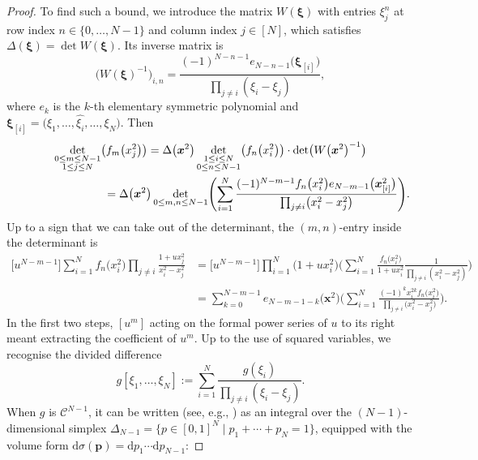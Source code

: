 \documentclass[pdftex]{sigma}
\numberwithin{equation}{section}
\newcommand{\dd}{\mathrm{d}}
\begin{document}
\begin{proof}
To find such a bound, we introduce the matrix $W(\boldsymbol{\xi})$ with entries $\xi_j^{n}$ at row index $n \in \{0,\dots,N - 1\}$ and column index $j \in [N]$, which satisfies $\Delta(\boldsymbol{\xi}) = \det W(\boldsymbol{\xi})$. Its inverse matrix is
\[
\bigl(W(\boldsymbol{\xi})^{-1}\bigr)_{i,n} = \frac{(-1)^{N - n - 1}e_{N - n - 1}\bigl(\boldsymbol{\xi}_{[i]}\bigr)}{\prod_{j \neq i} (\xi_i - \xi_j)},
\]
where $e_k$ is the $k$-th elementary symmetric polynomial and $\boldsymbol{\xi}_{[i]} = \bigl(\xi_1,\dots,\widehat{\xi_i},\dots,\xi_N\bigr)$. Then
\begin{gather}
\nonumber \mathop{\det}_{\substack{0 \leq m \leq N - 1 \\ 1 \leq j \leq N }} \bigl(f_m\bigl(x_j^2\bigr)\bigr) = \Delta\bigl(\boldsymbol{x}^2\bigr) \det_{\substack{1 \leq i \leq N \\ 0 \leq n \leq N - 1}} \bigl(f_n\bigl(x_i^2\bigr)\bigr) \cdot \det \bigl(W\bigl(\boldsymbol{x}^2\bigr)^{-1}\bigr) \\
\hphantom{\mathop{\det}_{\substack{0 \leq m \leq N - 1 \\ 1 \leq j \leq N }} \bigl(f_m\bigl(x_j^2\bigr)\bigr)}{} = \Delta\bigl(\boldsymbol{x}^2\bigr) \det_{0 \leq m,n \leq N - 1} \Biggl(\sum_{i = 1}^{N} \frac{(-1)^{N - m - 1} f_n\bigl(x_i^2\bigr) e_{N - m - 1}\bigl(\boldsymbol{x}^2_{[i]}\bigr)}{\prod_{j \neq i} \bigl(x_i^2 - x_j^2\bigr)}\Biggr).\label{26}
\end{gather}
Up to a sign that we can take out of the determinant, the $(m,n)$-entry inside the determinant is
\begin{align*}
 \bigl[u^{N - m - 1}\bigr] \sum_{i = 1}^N f_n\bigl(x_i^2\bigr) \prod_{j \neq i} \frac{1 + ux_j^2}{x_i^2 - x_j^2} & = \bigl[u^{N - m - 1}\bigr] \prod_{i = 1}^N \bigl(1 + ux_i^2\bigr)\!\Biggl( \sum_{i = 1}^N \frac{f_n\bigl(x_i^2\bigr)}{1 + ux_i^2} \frac{1}{\prod_{j \neq i} (x_i^2 - x_j^2)}\Biggr) \\
& = \sum_{k = 0}^{N - m - 1} e_{N - m - 1 - k}\bigl(\boldsymbol{x}^2\bigr)\!\Biggl( \sum_{i = 1}^{N} \frac{(-1)^k x_i^{2k} f_{n}\bigl(x_i^2\bigr)}{\prod_{j \neq i} \bigl(x_i^2 - x_j^2\bigr)}\Biggr).
\end{align*}
In the first two steps, $[u^m]$ acting on the formal power series of $u$ to its right meant extracting the coefficient of $u^m$. Up to the use of squared variables, we recognise the divided difference
\[
g[\xi_1,\dots,\xi_N] := \sum_{i = 1}^N \frac{g(\xi_i)}{\prod_{j \neq i} (\xi_i - \xi_j)}.
\]
When $g$ is $\mathcal{C}^{N - 1}$, it can be written (see, e.g., \cite[Theorem 2, p.~250]{AnaN}) as an integral over the $(N - 1)$-dimensional simplex $\Delta_{N - 1} = \{p \in [0,1]^N \mid p_1 + \cdots + p_N = 1\}$, equipped with the volume form $\dd \sigma(\boldsymbol{p}) = \dd p_1 \cdots \dd p_{N - 1}$:

\end{proof}
\end{document}

